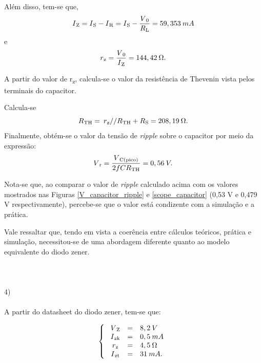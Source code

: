 \documentclass[journal, a4paper]{IEEEtran}
\begin{document}
    Além disso, tem-se que,
        \begin{equation}
             I\textsubscript{Z} = I\textsubscript{S} - I\textsubscript{R} = I\textsubscript{S} - \frac{V\textsubscript{0}}{R\textsubscript{L}} = 59,353 \: mA
        \end{equation}
    e
        \begin{equation}
            r\textsubscript{z} = \frac{V\textsubscript{0}}{I\textsubscript{Z}} = 144,42 \: \Omega.
        \end{equation}
        
    \tab A partir do valor de r\textsubscript{z}, calcula-se o valor da resistência de Thevenin vista pelos terminais do capacitor. 
    
    Calcula-se
        \begin{equation}
            R\textsubscript{TH} = \: r\textsubscript{z}//R\textsubscript{TH} + R\textsubscript{S} = 208,19 \: \Omega.
        \end{equation}
    Finalmente, obtém-se o valor da tensão de \textit{ripple} sobre o capacitor por meio da expressão: 
        \begin{equation}
            V\textsubscript{r} = \frac{V\textsubscript{C(pico)}}{2fCR\textsubscript{TH}} = 0,56 \: V.
        \end{equation}
        
    \tab Nota-se que, ao comparar o valor de \textit{ripple} calculado acima com os valores mostrados nas Figuras \ref{V_capacitor_ripple} e \ref{scope_capacitor} (0,53 V e 0,479 V respectivamente), percebe-se que o valor está condizente com a simulação e a prática.  
    
    \tab Vale ressaltar que, tendo em vista a coerência entre cálculos teóricos, prática e simulação, necessitou-se de uma abordagem diferente quanto ao modelo equivalente do diodo zener.   
\\~\\
\\~\\
    4)
\\~\\
    
   \tab A partir do datasheet do diodo zener, tem-se que:
    
            \begin{equation}\label{datasheet zener}
        \left\{\begin{array}{ccl}
        \ V\textsubscript{Z}&=&8,2 \:V\\
        \  I\textsubscript{zk}&=&0,5 \:mA\\
        \  r\textsubscript{z}&=&4,5 \:\Omega\\
        \ I\textsubscript{zt}&=&31 \:mA.
        \end{array}\right. 
        \end{equation}
        
\end{document}
